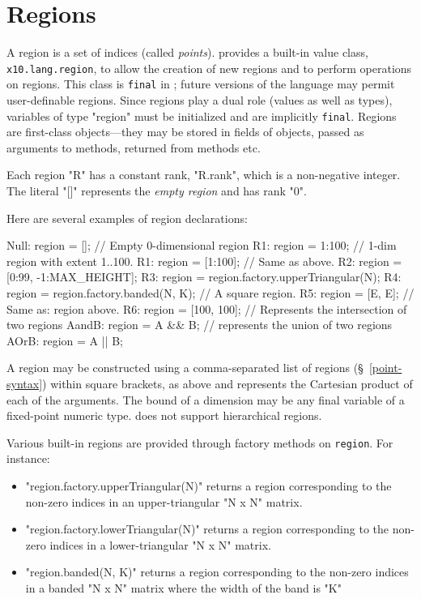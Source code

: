 \section{Regions}\label{XtenRegions}

A region is a set of indices (called {\em points}).  {}\Xten{}
provides a built-in value class, {\tt x10.lang.region}, to allow the
creation of new regions and to perform operations on regions. This
class is {\tt final} in {}\XtenCurrVer; future versions of the
language may permit user-definable regions. Since regions play a dual
role (values as well as types), variables of type \xcd"region" must be
initialized and are implicitly {\tt final}. Regions are first-class
objects---they may be stored in fields of objects, passed as
arguments to methods, returned from methods etc.

Each region \xcd"R" has a constant rank, \xcd"R.rank", which is a
non-negative integer. The literal \xcd"[]" represents the {\em empty
region} and has rank \xcd"0".

Here are several examples of region declarations:
\begin{xten}
Null: region = [];  // Empty 0-dimensional region          
R1: region = 1:100; // 1-dim region with extent 1..100.
R1: region = [1:100]; // Same as above.
R2: region = [0:99, -1:MAX_HEIGHT];   
R3: region = region.factory.upperTriangular(N);
R4: region = region.factory.banded(N, K);
   // A square region.
R5: region = [E, E];           
   // Same as: region above.
R6: region = [100, 100];       
   // Represents the intersection of two regions
AandB: region = A && B;       
  // represents the union of two regions
AOrB: region = A || B;        
\end{xten}

A region may be constructed using a comma-separated list of regions
(\S~\ref{point-syntax}) within square brackets, as above and represents
the Cartesian product of each of the arguments.  The bound of a
dimension may be any final variable of a fixed-point numeric
type. \XtenCurrVer{} does not support hierarchical regions.

Various built-in regions are provided through  factory
methods on {\tt region}.  For instance:
\begin{itemize}
{}\item \xcd"region.factory.upperTriangular(N)" returns a region corresponding
to the non-zero indices in an upper-triangular \xcd"N x N" matrix.
{}\item \xcd"region.factory.lowerTriangular(N)" returns a region corresponding
to the non-zero indices in a lower-triangular \xcd"N x N" matrix.
{}\item \xcd"region.banded(N, K)" returns a region corresponding to
the non-zero indices in a banded \xcd"N x N" matrix where the width of
the band is \xcd"K"
\end{itemize}

